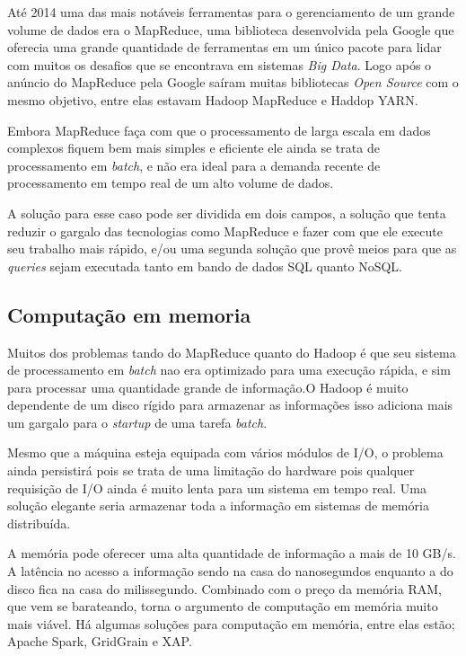 Até 2014 uma das mais notáveis ferramentas para o gerenciamento de um grande volume de dados era o MapReduce, uma biblioteca desenvolvida pela Google que oferecia uma grande quantidade de ferramentas em um único pacote para lidar com muitos os desafios que se encontrava em sistemas \textit{Big Data}. Logo após o anúncio do MapReduce pela Google saíram muitas bibliotecas \textit{Open Source} com o mesmo objetivo, entre elas estavam  Hadoop MapReduce e Haddop YARN.

Embora MapReduce faça com que o processamento de larga escala em dados complexos fiquem bem mais simples e eficiente ele ainda se trata de processamento em \textit{batch}, e não era ideal para a demanda recente de processamento em tempo real de um alto volume de dados.

A solução para esse caso pode ser dividida em dois campos, a solução que tenta reduzir o gargalo das tecnologias como MapReduce e fazer com que ele execute seu trabalho mais rápido, e/ou uma segunda solução que provê meios para que as \textit{queries} sejam executada tanto em bando de dados SQL quanto NoSQL.~\cite{realtime}

\subsection{Computação em memoria}

Muitos dos problemas tando do MapReduce quanto do Hadoop é que seu sistema de processamento em \textit{batch} nao era optimizado para uma execução rápida, e sim para processar uma quantidade grande de informação.O Hadoop é muito dependente de um disco rígido para armazenar as informações isso adiciona mais um gargalo para o \textit{startup} de uma tarefa \textit{batch}.

Mesmo que a máquina esteja equipada com vários módulos de I/O, o problema ainda persistirá pois se trata de uma limitação do hardware pois qualquer requisição de I/O ainda é muito lenta para um sistema em tempo real. Uma solução elegante seria armazenar toda a informação em sistemas de memória distribuída.

A memória pode oferecer uma alta quantidade de informação a mais de 10 GB/s. A latência no acesso a informação sendo na casa do nanosegundos enquanto a do disco fica na casa do milissegundo. Combinado com o preço da memória RAM, que vem se barateando, torna o argumento de computação em memória muito mais viável. Há algumas soluções para computação em memória, entre elas estão; Apache Spark, GridGrain e XAP.

